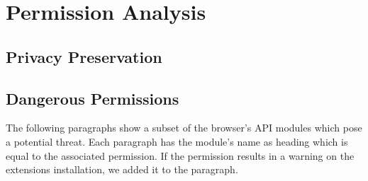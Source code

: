 
\section{Permission Analysis}

	
\subsection{Privacy Preservation}
	
\subsection{Dangerous Permissions}
	
	The following paragraphs show a subset of the browser's API modules which pose a potential threat. Each paragraph has the module's name as heading which is equal to the associated permission. If the permission results in a warning on the extensions installation, we added it to the paragraph.

\newenvironment{permissionwarning}{%
	\setlength\topsep{4pt}
	\setlength\parskip{0pt}
	\itshape
	\begin{center}
	}{%
\end{center}
}
	
